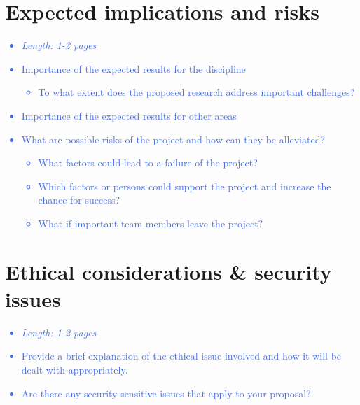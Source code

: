 \documentclass[a4paper,11pt]{article}
\providecommand*{\note}[1]{\small \textcolor{RoyalBlue}{\begin{minipage}{\textwidth}{#1}\end{minipage}}}
\begin{document}
\section{Expected implications and risks}
\label{sect:implication-risk}

\note{
\begin{itemize}
\item {\em Length: 1-2 pages}
\item Importance of the expected results for the discipline
	\begin{itemize}
	\item     To what extent does the proposed research address important challenges?
	\end{itemize}
\item Importance of the expected results for other areas
\item What are possible risks of the project and how can they be alleviated?
	\begin{itemize}
	\item     What factors could lead to a failure of the project?
	\item     Which factors or persons could support the project and increase the chance for success?
	\item     What if important team members leave the project?
	\end{itemize}
\end{itemize}
}

\section{Ethical considerations \& security issues}
\label{sect:ethics-security}

\note{
\begin{itemize}
\item {\em Length: 1-2 pages}
\item Provide a brief explanation of the ethical issue involved and how it will be dealt with appropriately.
\item Are there any security-sensitive issues that apply to your proposal?
\end{itemize}
}
\end{document}

